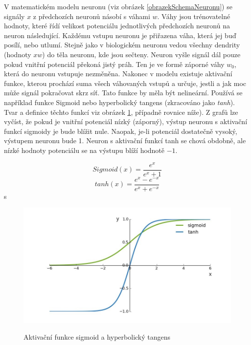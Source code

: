 V matematickém modelu neuronu (viz obrázek \ref{obrazekSchemaNeuronu}) 
se signály $ x $ z předchozích neuronů
násobí s váhami $ w $.
Váhy jsou trénovatelné hodnoty, 
které řídí velikost potenciálu
jednotlivých předchozích neuronů na neuron následující. 
Každému vstupu neuronu je přiřazena váha, 
která jej buď posílí, nebo utlumí.
Stejně jako v biologickém neuronu vedou všechny dendrity (hodnoty $ xw $)
do těla neuronu, kde jsou sečteny.
Neuron vyšle signál dál pouze pokud vnitřní potenciál překoná jistý práh.
Ten je ve formě záporné váhy $ w_0 $, 
která do neuronu vstupuje nezměněna.
Nakonec v modelu existuje aktivační funkce,
kterou prochází suma všech váhovaných vstupů a
určuje, jestli a jak moc může signál pokračovat skrz síť.
Tato funkce by měla být nelineární.
Používá se například funkce Sigmoid nebo hyperbolický tangens 
(zkracováno jako \emph{tanh}).
Tvar a definice těchto funkcí viz obrázek \ref{obrazekAktivačníFunkce},
případně rovnice níže).
Z grafů lze vyčíst, že pokud je vnitřní potenciál nízký (záporný), 
výstup neuronu s aktivační funkcí sigmoidy je bude blížit nule.
Naopak, je-li potenciál dostatečně vysoký, výstupem neuronu bude 1.
Neuron s aktivační funkcí tanh se chová obdobně,
ale nízké hodnoty potenciálu se na výstupu blíží hodnotě $ -1 $.
\cite{Goodfellow-et-al-2016, Nicholson_NeuralNets}

$$ Sigmoid(x) = \frac{e^x}{e^x + 1}$$
$$ tanh(x) = \frac{e^x - e^{-x}}{e^x + e^{-x}}$$s

\begin{figure}[h]\centering
    \centering
    \includegraphics[width=0.6\linewidth]{obrazky/tanh_v_sigmoid.jpg}\\[1pt]  
    \caption{Aktivační funkce sigmoid a hyperbolický tangens}    
    \label{obrazekAktivačníFunkce}
\end{figure}

